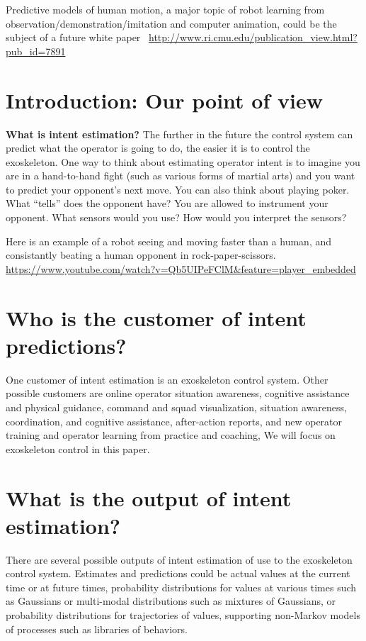 \documentclass[letterpaper,12pt,fullpage]{article}
\begin{document}
Predictive models of human motion, a major topic of robot learning from\\
observation/demonstration/imitation and computer animation,
could be the subject of a future white
paper~\cite{IEEE06913830}
\url{http://www.ri.cmu.edu/publication_view.html?pub_id=7891}

\section{Introduction: Our point of view}

{\bf What is intent estimation?}
The further in the future the control system can predict what the operator
is going to do, the easier it is to control the exoskeleton. One way
to think about estimating operator intent is to imagine you are in
a hand-to-hand fight (such as various forms of martial arts)
and you want to predict your opponent's next move.
You can also think about playing poker. What ``tells'' does the opponent
have?
You are allowed to instrument your opponent. What sensors would you use?
How would you interpret the sensors?

Here is an example of a robot seeing and moving faster than a human, and
consistantly beating a human opponent in rock-paper-scissors.
\url{https://www.youtube.com/watch?v=Qb5UIPeFClM&feature=player_embedded}

\section{Who is the customer of intent predictions?}

One customer of intent estimation is an exoskeleton control system.
Other possible customers are online operator situation awareness,
cognitive assistance
and physical guidance,
command and squad visualization, situation awareness,
coordination, and cognitive assistance,
after-action reports, and new operator training and
operator learning from practice and coaching,
We will focus on exoskeleton control in this paper.

\section{What is the output of intent estimation?}

There are several possible outputs of intent estimation of use to the
exoskeleton control system.
Estimates and predictions could be actual values at the current time or at
future times, probability distributions for
values at various times such as Gaussians or multi-modal distributions 
such as mixtures of Gaussians, or probability distributions for trajectories
of values, supporting non-Markov models of processes such as libraries
of behaviors.
\end{document}
